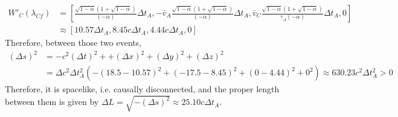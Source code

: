 \documentclass[12pt]{article}
\begin{document}
\begin{align*}
W'_C(\lambda_{Cf}) &=  \left[\frac{\sqrt{1 - \alpha} \left( 1 + \sqrt{1 - \alpha} \right)}{(-\alpha)} \Delta t_A, - \bar{v}_A \frac{\sqrt{1 - \alpha} \left( 1 + \sqrt{1 - \alpha} \right)}{(-\alpha)} \Delta t_A, \bar{v}_C \frac{\sqrt{1 - \alpha} \left( 1 + \sqrt{1 - \alpha} \right)}{\gamma_A (-\alpha)} \Delta t_A, 0 \right]\\[1em]
&\approx \left[ 10.57 \Delta t_A, 8.45 c \Delta t_A, 4.44 c \Delta t_A, 0\right]
\end{align*}
Therefore, between those two events,
\begin{align*}
(\Delta s)^2 &= -c^2 (\Delta t)^2 + + (\Delta x)^2 + (\Delta y)^2 + (\Delta z)^2 \\[1em]
&= \Delta c^2 \Delta t_A^2 \left(- (18.5 - 10.57)^2 + (- 17.5 - 8.45)^2 + (0 - 4.44)^2 + 0^2\right) \approx 630.23 c^2 \Delta t_A^2 > 0
\end{align*}
Therefore, it is spacelike, i.e. causally disconnected, and the proper length between them is given by $\Delta L = \sqrt{- (\Delta s)^2} \approx 25.10 c \Delta t_A$.
\end{document}
